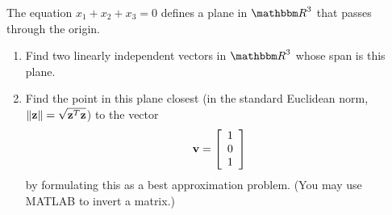 The equation $x_1 + x_2 + x_3 = 0$ defines a plane in $\R^3$ that passes through the origin.
\begin{enumerate}
\item Find two linearly independent vectors in $\R^3$ whose span is this plane.
\item Find the point in this plane closest (in the standard Euclidean norm,
$\|{\bf z}\| = \sqrt{{\bf z}^T{\bf z}}$) to the vector
\[ 
{\bf v} = \left[\begin{array}{c}
1\\ 0\\ 1
\end{array}
\right]
\]
by formulating this as a best approximation problem.
(You may use MATLAB to invert a matrix.)

\end{enumerate}


